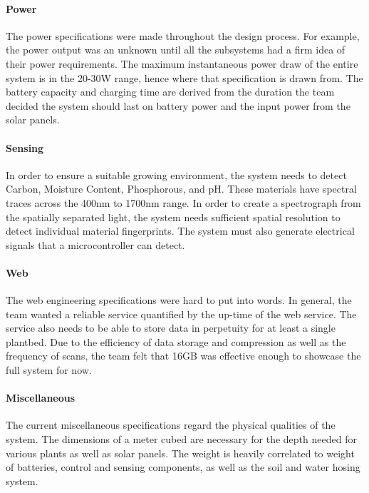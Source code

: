 \paragraph{Power}
The power specifications were made throughout the design process. For example, the power output was an unknown until all the subsystems had a firm idea of their power requirements. The maximum instantaneous power draw of the entire system is in the 20-30W range, hence where that specification is drawn from. The battery capacity and charging time are derived from the duration the team decided the system should last on battery power and the input power from the solar panels.

\paragraph{Sensing}
In order to ensure a suitable growing environment, the system needs to detect Carbon, Moisture Content, Phosphorous, and pH. These materials have spectral traces across the 400nm to 1700nm range. In order to create a spectrograph from the spatially separated light, the system needs sufficient spatial resolution to detect individual material fingerprints. The system must also generate electrical signals that a microcontroller can detect.
\paragraph{Web}
The web engineering specifications were hard to put into words. In general, the team wanted a reliable service quantified by the up-time of the web service. The service also needs to be able to store data in perpetuity for at least a single plantbed. Due to the efficiency of data storage and compression as well as the frequency of scans, the team felt that 16GB was effective enough to showcase the full system for now.

\paragraph{Miscellaneous}
The current miscellaneous specifications regard the physical qualities of the system. The dimensions of a meter cubed are necessary for the depth needed for various plants as well as solar panels. The weight is heavily correlated to weight of batteries, control and sensing components, as well as the soil and water hosing system. 
